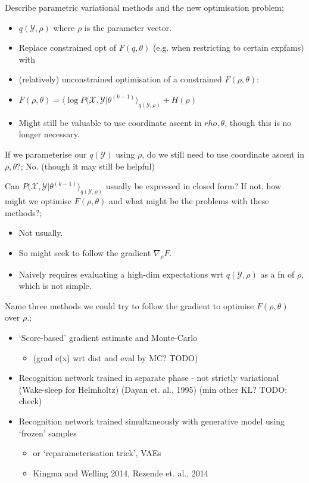 \documentclass{article}
\begin{document}
Describe parametric variational methods and the new optimisation problem; \begin{itemize}
    \item $q(\mathcal{Y}, \rho)$ where $\rho$ is the parameter vector.
    \item Replace constrained opt of $F(q,\theta)$ (e.g. when restricting to certain expfams) with
    \item (relatively) unconstrained optimisation of a constrained $F(\rho, \theta)$: 
    \item $F(\rho, \theta) = \langle \log P(\mathcal{X, Y}|\theta^{(k-1)}\rangle_{q(\mathcal{Y}, \rho)}+ H(\rho) $
    \item Might still be valuable to use coordinate ascent in $rho, \theta$, though this is no longer necessary.
\end{itemize}

If we parameterise our $q(\mathcal{Y})$ using $\rho$, do we still need to use coordinate ascent in $\rho, \theta$?; No. (though it may still be helpful)

Can $P(\mathcal{X, Y}|\theta^{(k-1)}\rangle_{q(\mathcal{Y}, \rho)}$ usually be expressed in closed form? If not, how might we optimise $F(\rho, \theta)$ and what might be the problems with these methods?; \begin{itemize}
    \item Not usually.
    \item So might seek to follow the gradient $\nabla_\rho F$.
    \item Naively requires evaluating a high-dim expectations wrt $q(\mathcal{Y}, \rho)$ as a fn of $\rho$, which is not simple.
\end{itemize}

Name three methods we could try to follow the gradient to optimise $F(\rho, \theta)$ over $\rho$.; \begin{itemize}
    \item `Score-based' gradient estimate and Monte-Carlo \begin{itemize}
        \item (grad e(x) wrt dist and eval by MC? TODO)
    \end{itemize}
    \item Recognition network trained in separate phase - not strictly variational (Wake-sleep for Helmholtz) (Dayan et. al., 1995) (min other KL? TODO: check)
    \item Recognition network trained simultaneously with generative model using `frozen' samples \begin{itemize}
        \item or `reparameterisation trick', VAEs
        \item Kingma and Welling 2014, Rezende et. al., 2014
    \end{itemize}
\end{itemize}
\end{document}

